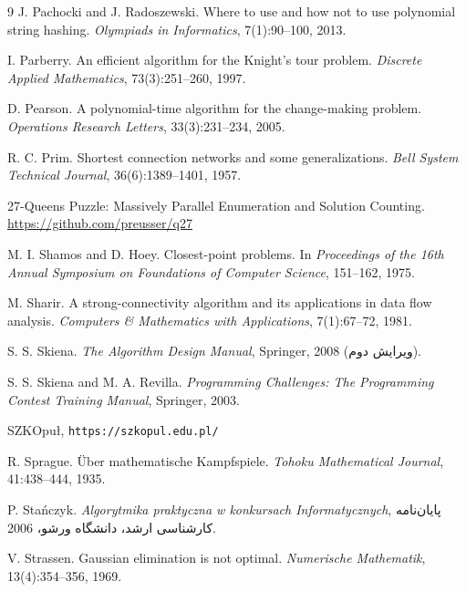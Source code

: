 \begin{thebibliography}{9}
  J. Pachocki and J. Radoszewski.
  Where to use and how not to use polynomial string hashing.
  \emph{Olympiads in Informatics}, 7(1):90--100, 2013.

  I. Parberry.
  An efficient algorithm for the Knight's tour problem.
  \emph{Discrete Applied Mathematics}, 73(3):251--260, 1997.


  D. Pearson.
  A polynomial-time algorithm for the change-making problem.
  \emph{Operations Research Letters}, 33(3):231--234, 2005.

  R. C. Prim.
  Shortest connection networks and some generalizations.
  \emph{Bell System Technical Journal}, 36(6):1389--1401, 1957.


  27-Queens Puzzle: Massively Parallel Enumeration and Solution Counting.
  \url{https://github.com/preusser/q27}

  M. I. Shamos and D. Hoey.
  Closest-point problems.
  In \emph{Proceedings of the 16th Annual Symposium on Foundations of Computer Science}, 151--162, 1975.

  M. Sharir.
  A strong-connectivity algorithm and its applications in data flow analysis.
  \emph{Computers \& Mathematics with Applications}, 7(1):67--72, 1981.

  S. S. Skiena.
  \emph{The Algorithm Design Manual}, Springer, 2008 (ویرایش دوم).

  S. S. Skiena and M. A. Revilla.
  \emph{Programming Challenges: The Programming Contest Training Manual},
  Springer, 2003.

  SZKOpuł, \texttt{https://szkopul.edu.pl/}

  R. Sprague.
  Über mathematische Kampfspiele.
  \emph{Tohoku Mathematical Journal}, 41:438--444, 1935.

  P. Stańczyk.
  \emph{Algorytmika praktyczna w konkursach Informatycznych},
  پایان‌نامه کارشناسی ارشد، دانشگاه ورشو، 2006.

  V. Strassen.
  Gaussian elimination is not optimal.
  \emph{Numerische Mathematik}, 13(4):354--356, 1969.


\end{thebibliography}

